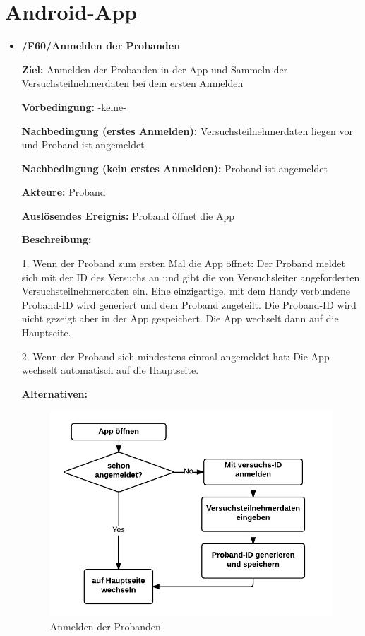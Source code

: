 \documentclass[a4paper]{scrreprt}
\begin{document}
    \newpage
    \section{Android-App}

        \begin{itemize}
            \item \textbf{/F60/Anmelden der Probanden}

                \par \textbf{Ziel: }Anmelden der Probanden in der App und Sammeln der Versuchsteilnehmerdaten bei dem ersten Anmelden
                \par \textbf{Vorbedingung: }-keine-
                \par \textbf{Nachbedingung (erstes Anmelden): }Versuchsteilnehmerdaten liegen vor und Proband ist angemeldet
                \par \textbf{Nachbedingung (kein erstes Anmelden): }Proband ist angemeldet
                \par \textbf{Akteure: }Proband
                \par \textbf{Auslösendes Ereignis: }Proband öffnet die App
                \par \textbf{Beschreibung: }
                \par 1. Wenn der Proband zum ersten Mal die App öffnet: Der Proband meldet sich mit der ID des Versuchs an und gibt die
                 von Versuchsleiter angeforderten Versuchsteilnehmerdaten ein. Eine einzigartige, mit dem Handy verbundene Proband-ID wird generiert und dem Proband zugeteilt. Die Proband-ID wird nicht gezeigt aber in der App gespeichert. Die App wechselt dann auf die Hauptseite.
                \par 2. Wenn der Proband sich mindestens einmal angemeldet hat: Die App wechselt automatisch auf die Hauptseite.
                \par \textbf{Alternativen: }
                \begin{figure}[ht]
                    \centering
                    \includegraphics[scale=1]{AppAnmelden.jpeg}
                    \caption{Anmelden der Probanden}
                \end{figure}



\end{itemize}
\end{document}
